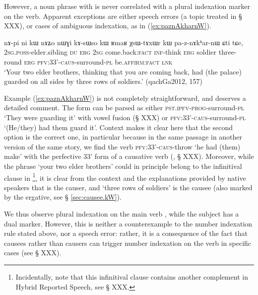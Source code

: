 However, a noun phrase with  is never correlated with a plural indexation marker on the verb. Apparent exceptions are either speech errors (a topic treated in § XXX), or cases of ambiguous indexation, as in (\ref{ex:paznAkharnW}).

\begin{exe}
\ex \label{ex:paznAkharnW}
 \gll  nɤ-pi ni kɯ nɤʑo nɯɣi kɤ-sɯso kɯ ʁmaʁ χsɯ-tɤxɯr kɯ pa-z-nɤkʰar-nɯ ɕti tɕe, \\
 \textsc{2sg}.\textsc{poss}-elder.sibling \textsc{du} \textsc{erg} \textsc{2sg} come.back:\textsc{fact} \textsc{inf}-think \textsc{erg} soldier three-round \textsc{erg} \textsc{pfv}:3\fl{}3'-\textsc{caus}-surround-\textsc{pl} be.\textsc{affirm}:\textsc{fact} \textsc{lnk} \\
 \glt `Your two elder brothers, thinking that you are coming back, had (the palace) guarded on all sides by three rows of soldiers.' (qachGa2012, 157)
\end{exe}

Example (\ref{ex:paznAkharnW}) is not completely straightforward, and deserves a detailed comment. The form  can be parsed as either  \textsc{pst}.\textsc{ipfv}-\textsc{prog}-surround-\textsc{pl} `They were guarding it' with vowel fusion (§ XXX) or  \textsc{pfv}:3\fl{}3'-\textsc{caus}-surround-\textsc{pl} `(He/they) had them guard it'. Context makes it clear here that the second option is the correct one, in particular because in the same passage in another version of the same story, we find the verb  \textsc{pfv}:3\fl{}3'-\textsc{caus}-throw `he had (them) make' with the perfective 3\fl{}3' form of a causative verb (\citealt[242]{jacques16complementation}, § XXX). Moreover, while the phrase   `your two elder brothers' could in principle belong to the infinitival clause in \footnote{Incidentally, note that this infinitival clause contains another complement in Hybrid Reported Speech, see § XXX.}, it is clear from the context and the explanations provided by native speakers that  is the causer, and  `three rows of soldiers' is the causee (also marked by the ergative, see § \ref{sec:causee.kW}). 

We thus observe plural indexation  on the main verb , while the subject   has a dual marker. However, this is neither a counterexample to the number indexation rule stated above, nor a speech error: rather, it is a consequence of the fact that causees rather than causers can trigger number indexation on the verb in specific cases (see § XXX).

